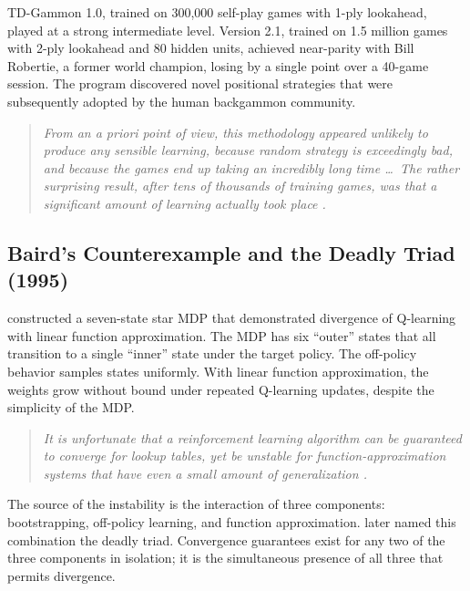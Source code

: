 TD-Gammon 1.0, trained on 300{,}000 self-play games with 1-ply lookahead, played at a strong intermediate level. Version 2.1, trained on 1.5 million games with 2-ply lookahead and 80 hidden units, achieved near-parity with Bill Robertie, a former world champion, losing by a single point over a 40-game session. The program discovered novel positional strategies that were subsequently adopted by the human backgammon community.

\begin{quote}\itshape
From an a priori point of view, this methodology appeared unlikely to produce any sensible learning, because random strategy is exceedingly bad, and because the games end up taking an incredibly long time \ldots\ The rather surprising result, after tens of thousands of training games, was that a significant amount of learning actually took place \citep{tesauro1994}.
\end{quote}

\subsection{Baird's Counterexample and the Deadly Triad (1995)}

\citet{Baird1995} constructed a seven-state star MDP that demonstrated divergence of Q-learning with linear function approximation. The MDP has six ``outer'' states that all transition to a single ``inner'' state under the target policy. The off-policy behavior samples states uniformly. With linear function approximation, the weights grow without bound under repeated Q-learning updates, despite the simplicity of the MDP.

\begin{quote}\itshape
It is unfortunate that a reinforcement learning algorithm can be guaranteed to converge for lookup tables, yet be unstable for function-approximation systems that have even a small amount of generalization \citep{Baird1995}.
\end{quote}

The source of the instability is the interaction of three components: bootstrapping, off-policy learning, and function approximation. \citet{sutton2018} later named this combination the deadly triad. Convergence guarantees exist for any two of the three components in isolation; it is the simultaneous presence of all three that permits divergence.

